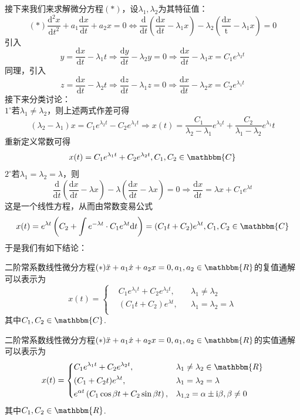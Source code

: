 \documentclass{ctexart}
\begin{document}
接下来我们来求解微分方程$(*)$，设$\lambda_{1},\lambda_{2}$为其特征值：
$$(*)\frac{\mathrm{d}^{2}x}{\mathrm{d}t^{2}}+a_{1}\frac{\mathrm{d}x}{\mathrm{d}t}+a_{2}x=0\Leftrightarrow \frac{\mathrm{d}}{\mathrm{d}t}\left(\frac{\mathrm{d}x}{\mathrm{d}t}-\lambda_{1}x\right)-\lambda_{2}\left(\frac{\mathrm{d}x}{\mathrm{t}}-\lambda_{1}x\right)=0$$
引入
$$y=\frac{\mathrm{d}x}{\mathrm{d}t}-\lambda_{1}t\Rightarrow \frac{\mathrm{d}y}{\mathrm{d}t}-\lambda_{2}y=0\Rightarrow \frac{\mathrm{d}x}{\mathrm{d}t}-\lambda_{1}x=C_{1}e^{\lambda_{2}t}$$
同理，引入
$$z=\frac{\mathrm{d}x}{\mathrm{d}t}-\lambda_{2}t\Rightarrow \frac{\mathrm{d}z}{\mathrm{d}t}-\lambda_{1}z=0\Rightarrow \frac{\mathrm{d}x}{\mathrm{d}t}-\lambda_{2}x=C_{2}e^{\lambda_{1}t}$$
接下来分类讨论：\\
$1^{\circ}$若$\lambda_{1}\neq \lambda_{2}$，则上述两式作差可得
$$(\lambda_{2}-\lambda_{1})x=C_{1}e^{\lambda_{2}t}-C_{2}e^{\lambda_{1}t}\Rightarrow x(t)=\frac{C_{1}}{\lambda_{2}-\lambda_{1}}e^{\lambda_{2}t}+\frac{C_{2}}{\lambda_{1}-\lambda_{2}}e^{\lambda_{1}}t$$
重新定义常数可得
$$x(t)=C_{1}e^{\lambda_{1}t}+C_{2}e^{\lambda_{2}t},C_{1},C_{2}\in\mathbbm{C}$$
$2^{\circ}$若$\lambda_{1}=\lambda_{2}=\lambda$，则
$$\frac{\mathrm{d}}{\mathrm{d}t}\left(\frac{\mathrm{d}x}{\mathrm{d}t}-\lambda x\right)-\lambda\left(\frac{\mathrm{d}x}{\mathrm{d}t}-\lambda x\right)=0\Rightarrow \frac{\mathrm{d}x}{\mathrm{d}t}=\lambda x+C_{1}e^{\lambda t}$$
这是一个线性方程，从而由常数变易公式
$$x(t)=e^{\lambda t}\left(C_{2}+\int{e^{-\lambda t}\cdot C_{1}e^{\lambda t}\mathrm{d}t}\right)=(C_{1}t+C_{2})e^{\lambda t},C_{1},C_{2}\in\mathbbm{C}$$
于是我们有如下结论：
\begin{theorem}[二阶常系数线性微分方程的复值通解]
二阶常系数线性微分方程$(*)\ddot{x}+a_{1}\dot{x}+a_{2}x=0,a_{1},a_{2}\in\mathbbm{R}$的复值通解可以表示为
$$x(t)=\left\{\begin{aligned}&C_{1}e^{\lambda_{1}t}+C_{2}e^{\lambda_{2}t},&&\lambda_{1}\neq \lambda_{2}\\&(C_{1}t+C_{2})e^{\lambda t},&&\lambda_{1}=\lambda_{2}=\lambda\\\end{aligned}\right.$$
其中$C_{1},C_{2}\in\mathbbm{C}$.
\end{theorem}

\begin{theorem}[二阶常系数线性微分方程的实值通解]
二阶常系数线性微分方程$(*)\ddot{x}+a_{1}\dot{x}+a_{2}x=0,a_{1},a_{2}\in\mathbbm{R}$的实值通解可以表示为
$$x(t)=\left\{\begin{aligned}&C_{1}e^{\lambda_{1}t}+C_{2}e^{\lambda_{2}t},&&\lambda_{1}\neq\lambda_{2}\in\mathbbm{R}\\&(C_{1}+C_{2}t)e^{\lambda t},&&\lambda_{1}=\lambda_{2}=\lambda\\&e^{\alpha t}\left(C_{1}\cos{\beta t}+C_{2}\sin{\beta t}\right),&&\lambda_{1,2}=\alpha\pm\mathrm{i}\beta,\beta\neq 0\\\end{aligned}\right.$$
其中$C_{1},C_{2}\in\mathbbm{R}$.
\end{theorem}
\end{document}
